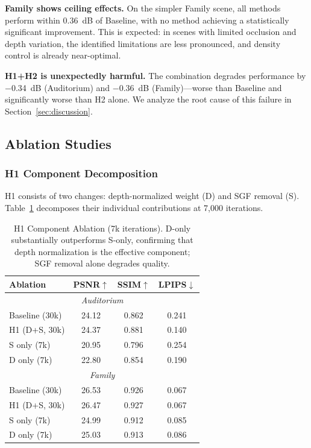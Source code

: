 \documentclass[conference]{IEEEtran}
\begin{document}
\textbf{Family shows ceiling effects.} On the simpler Family scene, all methods perform within 0.36~dB of Baseline, with no method achieving a statistically significant improvement. This is expected: in scenes with limited occlusion and depth variation, the identified limitations are less pronounced, and density control is already near-optimal.

\textbf{H1+H2 is unexpectedly harmful.} The combination degrades performance by $-$0.34~dB (Auditorium) and $-$0.36~dB (Family)—worse than Baseline and significantly worse than H2 alone. We analyze the root cause of this failure in Section~\ref{sec:discussion}.

\subsection{Ablation Studies}

\subsubsection{H1 Component Decomposition}

H1 consists of two changes: depth-normalized weight (D) and SGF removal (S). Table~\ref{tab:h1_ablation} decomposes their individual contributions at 7,000 iterations.

\begin{table}[t]
\centering
\caption{H1 Component Ablation (7k iterations). D-only substantially outperforms S-only, confirming that depth normalization is the effective component; SGF removal alone degrades quality.}
\label{tab:h1_ablation}
\begin{tabular}{lccc}
\toprule
Ablation & PSNR$\uparrow$ & SSIM$\uparrow$ & LPIPS$\downarrow$ \\
\midrule
\multicolumn{4}{c}{\textit{Auditorium}} \\
\quad Baseline (30k) & 24.12 & 0.862 & 0.241 \\
\quad H1 (D+S, 30k) & 24.37 & 0.881 & 0.140 \\
\quad S only (7k) & 20.95 & 0.796 & 0.254 \\
\quad D only (7k) & 22.80 & 0.854 & 0.190 \\
\midrule
\multicolumn{4}{c}{\textit{Family}} \\
\quad Baseline (30k) & 26.53 & 0.926 & 0.067 \\
\quad H1 (D+S, 30k) & 26.47 & 0.927 & 0.067 \\
\quad S only (7k) & 24.99 & 0.912 & 0.085 \\
\quad D only (7k) & 25.03 & 0.913 & 0.086 \\
\bottomrule
\end{tabular}
\end{table}
\end{document}
